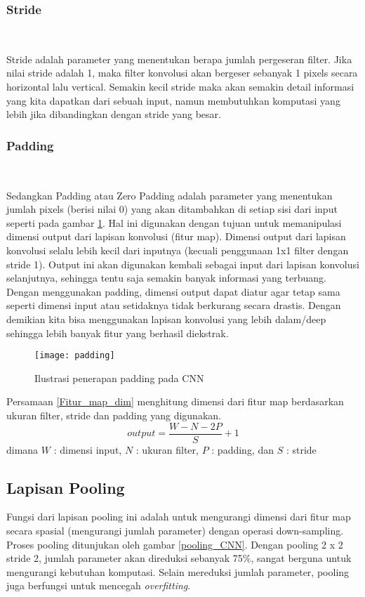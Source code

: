 \documentclass[../thesis.tex]{subfiles}
\begin{document}
\subsubsection{Stride} \hfill\

Stride adalah parameter yang menentukan berapa jumlah pergeseran filter. Jika nilai stride adalah 1, maka filter konvolusi akan bergeser sebanyak 1 pixels secara horizontal lalu vertical. 
Semakin kecil stride maka akan semakin detail informasi yang kita dapatkan dari sebuah input, namun membutuhkan komputasi yang lebih jika dibandingkan dengan stride yang besar.

\subsubsection{Padding} \hfill\

Sedangkan Padding atau Zero Padding adalah parameter yang menentukan jumlah pixels (berisi nilai 0) yang akan ditambahkan di setiap sisi dari input seperti pada gambar \ref{padding_CNN}. Hal ini digunakan dengan tujuan untuk memanipulasi dimensi output dari lapisan konvolusi (fitur map).
Dimensi output dari lapisan konvolusi selalu lebih kecil dari inputnya (kecuali penggunaan 1x1 filter dengan stride 1). Output ini akan digunakan kembali sebagai input dari lapisan konvolusi selanjutnya, sehingga tentu saja semakin banyak informasi yang terbuang.
Dengan menggunakan padding, dimensi output dapat diatur agar tetap sama seperti dimensi input atau setidaknya tidak berkurang secara drastis. Dengan demikian kita bisa menggunakan lapisan konvolusi yang lebih dalam/deep sehingga lebih banyak fitur yang berhasil diekstrak.

\begin{figure}
	\centering
	\texttt{[image: padding]}
	\caption{Ilustrasi penerapan padding pada CNN}
	\label{padding_CNN}
\end{figure}

Persamaan \ref{Fitur_map_dim} menghitung dimensi dari fitur map berdasarkan ukuran filter, stride dan padding yang digunakan.
\begin{equation}\label{Fitur_map_dim}
	output =\frac {W-N-2P}{S}+1
\end{equation}
dimana $W$ : dimensi input, $N$ : ukuran filter, $P$ : padding, dan $S$ : stride


\subsection{Lapisan Pooling}
Fungsi dari lapisan pooling ini adalah untuk mengurangi dimensi dari fitur map secara spasial (mengurangi jumlah
parameter) dengan operasi down-sampling. Proses pooling ditunjukan oleh gambar \ref{pooling_CNN}. Dengan pooling 2 x 2 stride 2, jumlah parameter akan direduksi sebanyak 75\%, sangat berguna untuk mengurangi kebutuhan komputasi. Selain
mereduksi jumlah parameter, pooling juga berfungsi untuk mencegah \textit{overfitting}.
\end{document}
